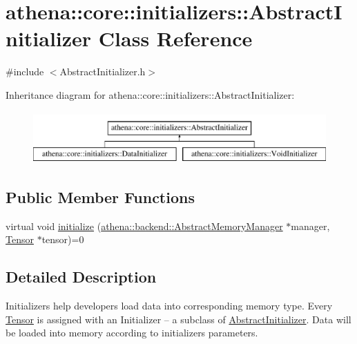 \hypertarget{classathena_1_1core_1_1initializers_1_1_abstract_initializer}{}\section{athena\+:\+:core\+:\+:initializers\+:\+:Abstract\+Initializer Class Reference}
\label{classathena_1_1core_1_1initializers_1_1_abstract_initializer}


{\ttfamily \#include $<$Abstract\+Initializer.\+h$>$}

Inheritance diagram for athena\+:\+:core\+:\+:initializers\+:\+:Abstract\+Initializer\+:\begin{figure}[H]
\begin{center}
\leavevmode
\includegraphics[height=2.000000cm]{d3/dd2/classathena_1_1core_1_1initializers_1_1_abstract_initializer}
\end{center}
\end{figure}
\subsection*{Public Member Functions}
\begin{DoxyCompactItemize}
\item 
virtual void \mbox{\hyperlink{classathena_1_1core_1_1initializers_1_1_abstract_initializer_a9c0f0c57add306c9da8ffe8797532f62}{initialize}} (\mbox{\hyperlink{classathena_1_1backend_1_1_abstract_memory_manager}{athena\+::backend\+::\+Abstract\+Memory\+Manager}} $\ast$manager, \mbox{\hyperlink{classathena_1_1core_1_1_tensor}{Tensor}} $\ast$tensor)=0
\end{DoxyCompactItemize}


\subsection{Detailed Description}
Initializers help developers load data into corresponding memory type. Every \mbox{\hyperlink{classathena_1_1core_1_1_tensor}{Tensor}} is assigned with an Initializer -- a subclass of \mbox{\hyperlink{classathena_1_1core_1_1initializers_1_1_abstract_initializer}{Abstract\+Initializer}}. Data will be loaded into memory according to initializer\textquotesingle{}s parameters. 

